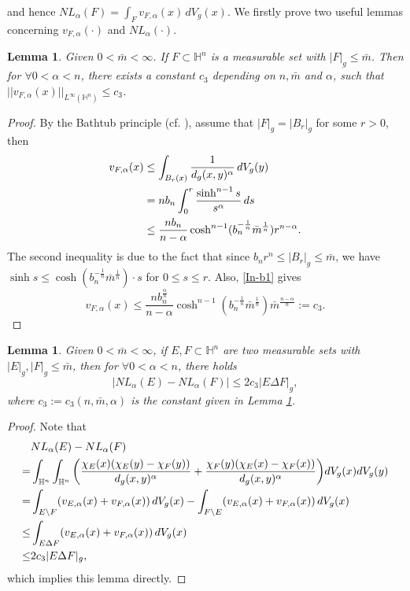 \documentclass[11pt,reqno]{amsart}
\newtheorem{lem}[thm]{Lemma}
\theoremstyle{definition}
\theoremstyle{remark}
\numberwithin{equation}{section}
\renewcommand{\(}{\left(}
\renewcommand{\)}{\right)}
\renewcommand{\-}{\overline}
\begin{document}
and hence $NL_{\alpha}(F)=\int_{F}{v_{F,\alpha}(x)}\,dV_g(x)$. We firstly prove two useful lemmas concerning $v_{F,\alpha}(\cdot)$ and $NL_{\alpha}(\cdot)$.
\begin{lem}\label{Lem-Bound}
	Given $0<\bar{m}<\infty$. If  $F\subset\mathbb{H}^n$ is a measurable set with $|F|_g\leq\bar{m}$. Then for $\forall 0<\alpha<n$, there exists a constant $c_3$ depending on $n, \bar{m}$ and $\alpha$, such that $||v_{F,\alpha}(x)||_{L^{\infty}(\mathbb{H}^n)}\leq c_3$.
\end{lem}
\begin{proof}
	By the Bathtub principle (cf. \cite[Theorem 1.14]{Leib-Loss01}), assume that $|F|_g=|B_r|_g$ for some $r>0$, then
	\begin{align}
		v_{F,\alpha}(x)&\leq\int_{B_r(x)}{\frac{1}{d_g(x,y)^{\alpha}}}\,dV_g(y)\notag\\
		&= n b_n\int_0^r\frac{\sinh^{n-1}s}{s^{\alpha}}\,ds\notag\\
		&\leq \frac{nb_n}{n-\alpha}\cosh^{n-1}(b_n^{-\frac{1}{n}}\bar{m}^{\frac{1}{n}})r^{n-\alpha}.\label{In-b1}
	\end{align}
The second inequality is due to the fact that since $b_n r^n\leq|B_r|_g\leq\bar{m}$, we have $\sinh s\leq \cosh(b_n^{-\frac{1}{n}}\bar{m}^{\frac{1}{n}})\cdot s$ for $0\leq s\leq r$. Also, \eqref{In-b1} gives
\begin{equation}\label{In-Bound}
	v_{F,\alpha}(x)\leq \frac{n b_n^{\frac{\alpha}{n}}}{n-\alpha}\cosh^{n-1}(b_n^{-\frac{1}{n}}\bar{m}^{\frac{1}{n}}){\bar{m}}^{\frac{n-\alpha}{n}}:=c_3.
\end{equation}
\end{proof}
\begin{lem}\label{Lem-NL}
	Given $0<\bar{m}<\infty$, if $E, F\subset\mathbb{H}^n$ are two measurable sets with $|E|_g, |F|_g\leq \bar{m}$, then for $\forall 0<\alpha<n$, there holds
	\begin{equation}\label{Eq-NL}
		|NL_{\alpha}(E)-NL_{\alpha}(F)|\leq 2c_3|E\Delta F|_g,
	\end{equation}
	where $c_3:=c_3(n,\bar{m},\alpha)$ is the constant given in Lemma \ref{Lem-Bound}.
\end{lem}
\begin{proof}
	Note that 
\begin{align}
	&NL_{\alpha}(E)-NL_{\alpha}(F)\notag\\
	=&\int_{\mathbb{H}^n}\int_{\mathbb{H}^n}{\left(\frac{\chi_E(x)(\chi_E(y)-\chi_F(y))}{d_g(x,y)^{\alpha}}+\frac{\chi_F(y)(\chi_E(x)-\chi_F(x))}{d_g(x,y)^{\alpha}}\right)}dV_g(x)dV_g(y)\notag\\
	=&\int_{E\setminus F}(v_{E,\alpha}(x)+v_{F,\alpha}(x))\,dV_g(x)-\int_{F\setminus E}(v_{E,\alpha}(x)+v_{F,\alpha}(x))\,dV_g(x)\notag\\
	\leq&\int_{E\Delta F}(v_{E,\alpha}(x)+v_{F,\alpha}(x))\,dV_g(x)\notag\\
	\leq&2c_3|E\Delta F|_g,\label{In-NL}
\end{align}
which implies this lemma directly.
\end{proof}
\end{document}
